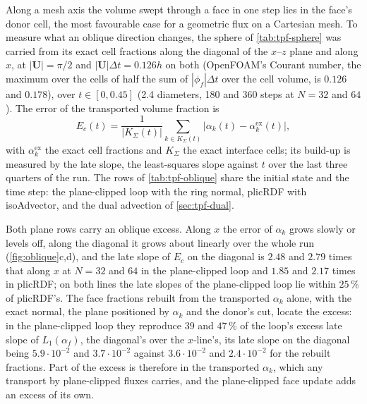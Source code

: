 \documentclass[preprint,12pt]{elsarticle}
\begin{document}
Along a mesh axis the volume swept through a face in one step lies in the face's donor cell, the most favourable case for a geometric flux on a Cartesian mesh. To measure what an oblique direction changes, the sphere of \cref{tab:tpf-sphere} was carried from its exact cell fractions along the diagonal of the $x$--$z$ plane and along $x$, at $|\mathbf{U}| = \pi/2$ and $|\mathbf{U}|\Delta t = 0.126h$ on both (OpenFOAM's Courant number, the maximum over the cells of half the sum of $|\phi_f|\Delta t$ over the cell volume, is $0.126$ and $0.178$), over $t \in [0, 0.45]$ (2.4 diameters, 180 and 360 steps at $N = 32$ and $64$). The error of the transported volume fraction is
\begin{equation}
E_c(t) = \frac{1}{|K_\Sigma(t)|}\sum_{k \in K_\Sigma(t)} \big|\alpha_k(t) - \alpha_k^{\mathrm{ex}}(t)\big|,
\label{eq:Ec}
\end{equation}
with $\alpha_k^{\mathrm{ex}}$ the exact cell fractions and $K_\Sigma$ the exact interface cells; its build-up is measured by the late slope, the least-squares slope against $t$ over the last three quarters of the run. The rows of \cref{tab:tpf-oblique} share the initial state and the time step: the plane-clipped loop with the ring normal, plicRDF with isoAdvector, and the dual advection of \cref{sec:tpf-dual}.

Both plane rows carry an oblique excess. Along $x$ the error of $\alpha_k$ grows slowly or levels off, along the diagonal it grows about linearly over the whole run (\cref{fig:oblique}c,d), and the late slope of $E_c$ on the diagonal is $2.48$ and $2.79$ times that along $x$ at $N = 32$ and $64$ in the plane-clipped loop and $1.85$ and $2.17$ times in plicRDF; on both lines the late slopes of the plane-clipped loop lie within $25\,\%$ of plicRDF's. The face fractions rebuilt from the transported $\alpha_k$ alone, with the exact normal, the plane positioned by $\alpha_k$ and the donor's cut, locate the excess: in the plane-clipped loop they reproduce $39$ and $47\,\%$ of the loop's excess late slope of $L_1(\alpha_f)$, the diagonal's over the $x$-line's, its late slope on the diagonal being $5.9\cdot10^{-2}$ and $3.7\cdot10^{-2}$ against $3.6\cdot10^{-2}$ and $2.4\cdot10^{-2}$ for the rebuilt fractions. Part of the excess is therefore in the transported $\alpha_k$, which any transport by plane-clipped fluxes carries, and the plane-clipped face update adds an excess of its own.
\end{document}
